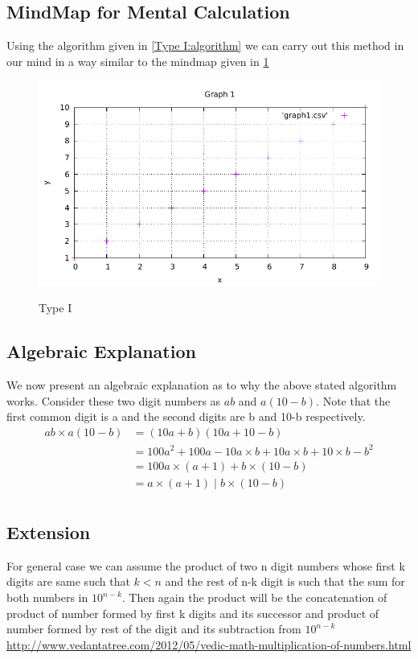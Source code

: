 \subsection{MindMap for Mental Calculation}
Using the algorithm given in \ref{Type I:algorithm} we can carry out this method in our mind in a way similar to the mindmap given in \ref{Figure1}

\begin{figure}[h]
	\label{Figure1}
	\centering
	\includegraphics[scale=1]{graph1.pdf} \\
	\caption{Type I}
\end{figure}
\newpage
\subsection{Algebraic Explanation}
We now present an algebraic explanation as to why the above stated algorithm works. Consider these two digit numbers as $ab$ and $a(10-b)$. Note that the first common digit is a and the second digits are b and 10-b respectively.
\begin{align*}
    ab  \times  a(10-b) & = ( 10a + b )( 10a + 10 - b ) \\
                 & = 100a^2 + 100a -10a \times b + 10a \times b + 10 \times b - b^2 \\
                 & = 100a \times (a+1) + b \times (10-b) \\
                 & = a \times (a+1) \; | \; b \times (10-b) \\
\end{align*}

\subsection{Extension}
For general case we can assume the product of two n digit numbers whose first k digits are same such that $k < n$ and the rest of n-k digit is such that the sum for both numbers in $ {10}^{n-k} $. Then again the product will be the concatenation of product of number formed by first k digits and its successor and product of number formed by rest of the digit and its subtraction from $ {10}^{n-k} $
\url {http://www.vedantatree.com/2012/05/vedic-math-multiplication-of-numbers.html}

